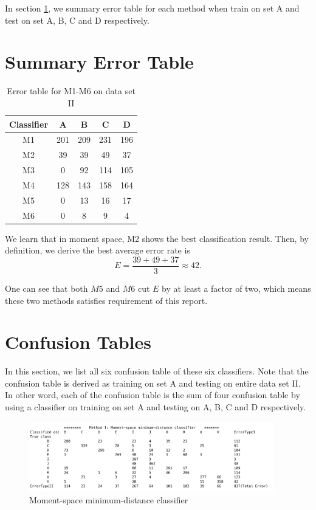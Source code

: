 \documentclass[12pt,letterpaper]{article}
\begin{document}
In section \ref{sec: summary_error_table}, we summary error table for each method when train on set A and test on set A, B, C and D respectively.

\section{Summary Error Table}\label{sec: summary_error_table}
\begin{table}[H]
\centering
\begin{tabular}{c || c c c c}
	Classifier  &  A & B & C & D \\
	\hline
            M1 & 201 & 209 & 231 & 196\\
            M2 &  39& 39 &  49& 37\\
            M3 &  0&  92& 114 & 105\\
           M4 &  128& 143 & 158 & 164\\
           \hline
        M5 &  0& 13 & 16 & 17\\
    	M6 &  0& 8 & 9 & 4\\
\end{tabular}	
 \caption{Error table for M1-M6 on data set II}
\end{table}

We learn that in moment space, M2 shows the best classification result. Then, by definition, we derive the best average error rate is
\begin{equation}
 E = \frac{39+49+37}{3} \approx 42.
\end{equation} 

One can see that both $M5$ and $M6$ cut $E$ by at least a factor of two, which means these two methods satisfies requirement of this report.

\section{Confusion Tables}\label{sec: Confusion_tables}

In this section, we list all six confusion table of these six classifiers. Note that the confusion table is derived as training on set A and testing on entire data set II. In other word, each of the confusion table is the sum of four confusion table by using a classifier on training on set A and testing on A, B, C and D respectively.
\begin{figure}[H]
\centering
\includegraphics[width=0.95\textwidth]{1}
\caption{Moment-space minimum-distance classifier}
\end{figure}
\end{document}
